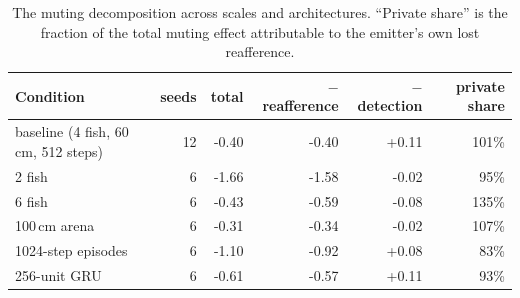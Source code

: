\begin{table}[t]
\centering\small
\caption{The muting decomposition across scales and architectures. ``Private share'' is the fraction of the total muting effect attributable to the emitter's own lost reafference.}
\label{tab:gen}
\begin{tabular}{lrrrrr}
\toprule
Condition & seeds & total & $-$reafference & $-$detection & private share \\
\midrule
baseline (4 fish, 60\,cm, 512 steps) & 12 & -0.40 & -0.40 & +0.11 & 101\% \\
2 fish & 6 & -1.66 & -1.58 & -0.02 & 95\% \\
6 fish & 6 & -0.43 & -0.59 & -0.08 & 135\% \\
100\,cm arena & 6 & -0.31 & -0.34 & -0.02 & 107\% \\
1024-step episodes & 6 & -1.10 & -0.92 & +0.08 & 83\% \\
256-unit GRU & 6 & -0.61 & -0.57 & +0.11 & 93\% \\
\bottomrule
\end{tabular}
\end{table}
